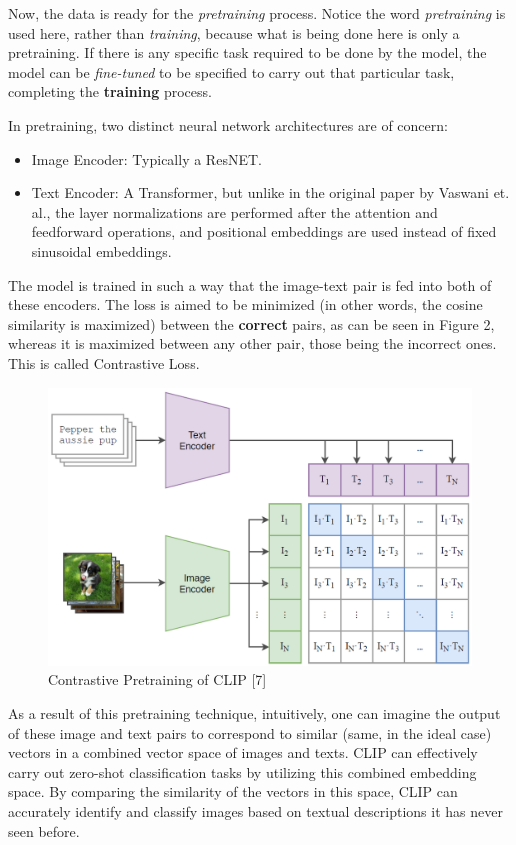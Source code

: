\documentclass{article}
\begin{document}
Now, the data is ready for the \textit{pretraining} process. Notice the word \textit{pretraining} is used here, rather than \textit{training}, because what is being done here is only a pretraining. If there is any specific task required to be done by the model, the model can be \textit{fine-tuned} to be specified to carry out that particular task, completing the \textbf{training} process.

In pretraining, two distinct neural network architectures are of concern:
\begin{itemize}
    \item Image Encoder: Typically a ResNET.
    \item Text Encoder: A Transformer, but unlike in the original paper by Vaswani et. al., the layer normalizations are performed after the attention and feedforward operations, and positional embeddings are used instead of fixed sinusoidal embeddings. 
\end{itemize}

The model is trained in such a way that the image-text pair is fed into both of these encoders. The loss is aimed to be minimized (in other words, the cosine similarity is maximized) between the \textbf{correct} pairs, as can be seen in Figure 2, whereas it is maximized between any other pair, those being the incorrect ones. This is called Contrastive Loss.

\begin{figure}[H]
    \centering
    \includegraphics[width=0.75\linewidth]{contrastive_pretraining.png}
    \caption{Contrastive Pretraining of CLIP [7]}
    \label{fig:enter-label}
\end{figure}

As a result of this pretraining technique, intuitively, one can imagine the output of these image and text pairs to correspond to similar (same, in the ideal case) vectors in a combined vector space of images and texts. CLIP can effectively carry out zero-shot classification tasks by utilizing this combined embedding space. By comparing the similarity of the vectors in this space, CLIP can accurately identify and classify images based on textual descriptions it has never seen before.
\end{document}
